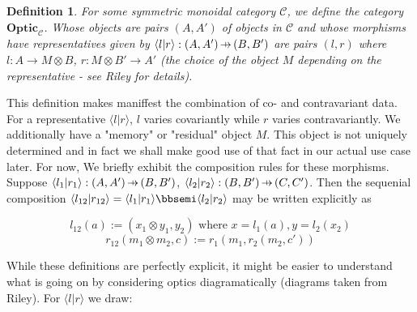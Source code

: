 \documentclass[letterpaper, 10 pt, conference]{ieeeconf}  %
\newtheorem{definition}{Definition}[paragraph]
\newcommand{\Optic}{\textbf{Optic}}
\newcommand{\hto}{\ensuremath{\,\mathaccent\shortmid\rightarrow\,}}
\begin{document}
\begin{definition}
For some symmetric monoidal category $\mathcal{C}$, we define the category
$\Optic_{\mathcal{C}}$. Whose objects are pairs $(A, A')$ of objects in $\mathcal{C}$
and whose morphisms have representatives given by $\langle l | r \rangle: (A, A') \hto (B, B')$
are pairs $(l, r)$ where $l: A \to M \otimes B$, $r: M \otimes B' \to A'$ (the choice of the object $M$ depending
on the representative - see Riley for details).
\end{definition}

This definition makes maniffest the combination of co- and contravariant data.
For a representative $\langle l | r \rangle$, $l$ varies covariantly while $r$
varies contravariantly. We additionally have a "memory" or "residual" object $M$.
This object is not uniquely determined and in fact we shall make good use of that
fact in our actual use case later. For now, We briefly exhibit the composition rules for these
morphisms. Suppose $\langle l_1 | r_1 \rangle: (A, A') \hto (B, B')$,
$\langle l_2 | r_2 \rangle: (B, B') \hto (C, C')$. Then
the sequenial composition $\langle l_{12} | r_{12} \rangle = \langle l_1 | r_1 \rangle \bbsemi \langle l_2 | r_2 \rangle$
may be written explicitly as

\[
l_{12}(a) := (x_1 \otimes y_1, y_2) \text { where } x = l_1(a), y = l_2(x_2) \]\[
r_{12}(m_1 \otimes m_2, c) := r_1(m_1, r_2(m_2, c'))
\]

While these definitions are perfectly explicit, it might be easier to understand
what is going on by considering optics diagramatically (diagrams taken from Riley\cite{riley:optics}).
For $\langle l | r \rangle$ we draw:

\begin{center}
\end{center}
\end{document}

